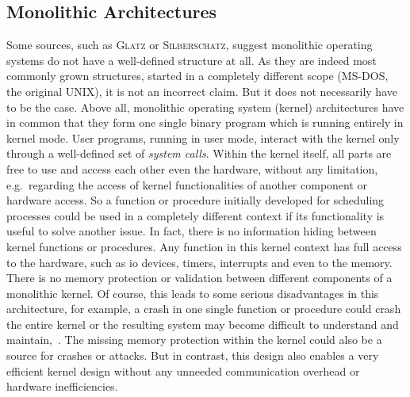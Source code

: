 \subsection{Monolithic Architectures}\label{sec:monolithic-archs}
Some sources, such as \textsc{Glatz}\cite{glatz2015betriebssysteme} or \textsc{Silberschatz}\cite{silberschatz2009operating}, suggest monolithic operating systems do not have a well-defined structure at all. 
As they are indeed most commonly grown structures, started in a completely different scope (MS-DOS, the original UNIX), it is not an incorrect claim.
But it does not necessarily have to be the case.
Above all, monolithic operating system (kernel) architectures have in common that they form one single binary program which is running entirely in kernel mode.
User programs, running in user mode, interact with the kernel only through a well-defined set of \textit{system calls}\cite{lfd430}. 
Within the kernel itself, all parts are free to use and access each other even the hardware, without any limitation, e.g.\ regarding the access of kernel functionalities of another component or hardware access. 
So a function or procedure initially developed for scheduling processes could be used in a completely different context if its functionality is useful to solve another issue.
In fact, there is no information hiding between kernel functions or procedures.
Any function in this kernel context has full access to the hardware, such as \ac{io} devices, timers, interrupts and even to the memory. 
There is no memory protection or validation between different components of a monolithic kernel. 
Of course, this leads to some serious disadvantages in this architecture, for example, a crash in one single function or procedure could crash the entire kernel or the resulting system may become difficult to understand and maintain\cite{tanenbaum-modern-operating-systems},~\cite{silberschatz2009operating}.
The missing memory protection within the kernel could also be a source for crashes or attacks.
But in contrast, this design also enables a very efficient kernel design without any unneeded communication overhead or hardware inefficiencies\cite{lfd430}.

